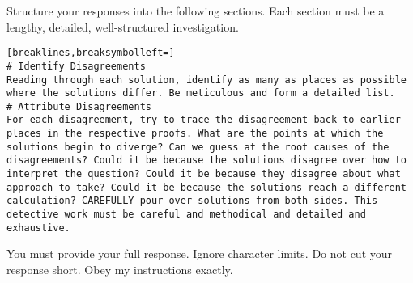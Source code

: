\begin{tcolorbox}[breakable,title=Comparison Prompt 3]
Structure your responses into the following sections. Each section must be a lengthy, detailed, well-structured investigation.
\begin{Verbatim}[breaklines,breaksymbolleft=]
# Identify Disagreements
Reading through each solution, identify as many as places as possible where the solutions differ. Be meticulous and form a detailed list.
# Attribute Disagreements
For each disagreement, try to trace the disagreement back to earlier places in the respective proofs. What are the points at which the solutions begin to diverge? Can we guess at the root causes of the disagreements? Could it be because the solutions disagree over how to interpret the question? Could it be because they disagree about what approach to take? Could it be because the solutions reach a different calculation? CAREFULLY pour over solutions from both sides. This detective work must be careful and methodical and detailed and exhaustive.
\end{Verbatim}

You must provide your full response. Ignore character limits. Do not cut your response short. Obey my instructions exactly.
\end{tcolorbox}

